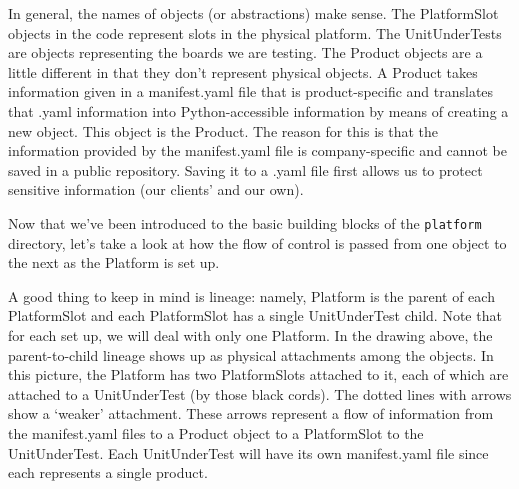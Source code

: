 \documentclass{report}
\begin{document}
In general, the names of objects (or abstractions) make sense. The PlatformSlot objects in the code represent slots in the physical platform. The UnitUnderTests are objects representing the boards we are testing. The Product objects are a little different in that they don't represent physical objects. A Product takes information given in a manifest.yaml file that is product-specific and translates that .yaml information into Python-accessible information by means of creating a new object. This object is the Product. The reason for this is that the information provided by the manifest.yaml file is company-specific and cannot be saved in a public repository. Saving it to a .yaml file first allows us to protect sensitive information (our clients' and our own).\\

	\begin{minipage}{\linewidth}
		\label{fig:platform}
	\end{minipage} 
	\vspace{5pt}		%

Now that we've been introduced to the basic building blocks of the \texttt{platform} directory, let's take a look at how the flow of control is passed from one object to the next as the Platform is set up.

A good thing to keep in mind is lineage: namely, Platform is the parent of each PlatformSlot and each PlatformSlot has a single UnitUnderTest child. Note that for each set up, we will deal with only one Platform. In the drawing above, the parent-to-child lineage shows up as physical attachments among the objects. In this picture, the Platform has two PlatformSlots attached to it, each of which are attached to a UnitUnderTest (by those black cords). The dotted lines with arrows show a `weaker' attachment. These arrows represent a flow of information from the manifest.yaml files to a Product object to a PlatformSlot to the UnitUnderTest. Each UnitUnderTest will have its own manifest.yaml file since each represents a single product. 
\end{document}
